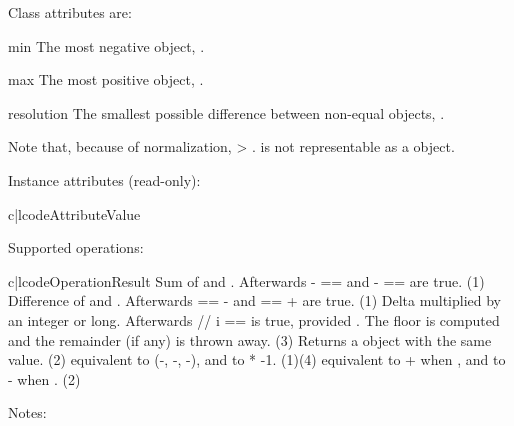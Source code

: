 Class attributes are:

\begin{memberdesc}{min}
  The most negative  object,
  .
\end{memberdesc}

\begin{memberdesc}{max}
  The most positive  object,
  .
\end{memberdesc}

\begin{memberdesc}{resolution}
  The smallest possible difference between non-equal
   objects, .
\end{memberdesc}

Note that, because of normalization,  \textgreater
{}.   is not representable as
a  object.

Instance attributes (read-only):

\begin{tableii}{c|l}{code}{Attribute}{Value}
\end{tableii}

Supported operations:

\begin{tableii}{c|l}{code}{Operation}{Result}
          {Sum of  and .
           Afterwards - ==  and -
           ==  are true.
          (1)}
          {Difference of  and .
           Afterwards  ==  -  and
            ==  +  are true.
          (1)}
          {Delta multiplied by an integer or long.
           Afterwards  // i ==  is true,
           provided .}
          {The floor is computed and the remainder (if any) is thrown away.
          (3)}
          {Returns a  object with the same value.
          (2)}
          {equivalent to (-, -,
           -), and to * -1.
          (1)(4)}
          {equivalent to + when , and to
           - when .
          (2)}
\end{tableii}
\noindent
Notes:

